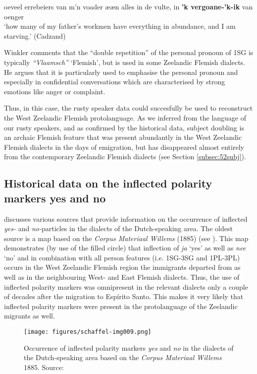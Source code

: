 \documentclass[output=paper,hidelinks,draftmode]{langscibook}
\begin{document}
\ea%
    \label{ex:schaffel:25}

oeveel errebeiers van m'n voader ææn alles in de vulte, in \textbf{{}'k vergoane-'k-ik} van oenger\\
\glt ‘how many of my father’s workmen have everything in abundance, and I am starving.’ (Cadzand)\\

\z

Winkler comments that the ``double repetition'' of the personal pronoun of 1SG is typically \textit{“Vlaamsch”} ‘Flemish’, but is used in some Zeelandic Flemish dialects. He argues that it is particularly used to emphasise the personal pronoun and especially in confidential conversations which are characterised by strong emotions like anger or complaint.


Thus, in this case, the rusty speaker data could succesfully be used to reconstruct the West Zeelandic Flemish protolanguage. As we inferred from the language of our rusty speakers, and as confirmed by the historical data, subject doubling is an archaic Flemish feature that was present abundantly in the West Zeelandic Flemish dialects in the days of emigration, but has disappeared almost entirely from the contemporary Zeelandic Flemish dialects (see Section \ref{subsec:52subj}). 


\subsection{Historical data on the inflected polarity markers yes and no}

\citet{Paardekooper1993} discusses various sources that provide information on the occurrence of inflected \textit{yes-} and \textit{no-}particles in the dialects of the Dutch-speaking area. The oldest source is a map based on the \textit{Corpus Materiaal Willems} (1885) (see ). This map demonstrates (by use of the filled circle) that inflection of \textit{ja} ‘yes’ as well as \textit{nee} ‘no’ and in combination with all person features (i.e. 1SG-3SG and 1PL-3PL) occurs in the West Zeelandic Flemish region the immigrants departed from as well as in the neighbouring West- and East Flemish dialects. Thus, the use of inflected polarity markers was omnipresent in the relevant dialects only a couple of decades after the migration to Espírito Santo. This makes it very likely that inflected polarity markers were present in the protolanguage of the Zeelandic migrants as well.


\begin{figure}[t]
\caption{Occurrence of inflected polarity markers \textit{yes} and \textit{no} in the dialects of the Dutch-speaking area based on the \textit{Corpus Materiaal Willems} 1885. Source: \citet{Paardekooper1993}}
	\label{fig:schaffel:8}
\texttt{[image: figures/schaffel-img009.png]}
\end{figure}
\end{document}
